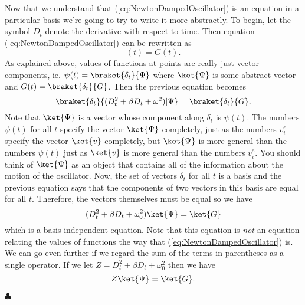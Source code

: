 Now that we understand that (\ref{eq:NewtonDampedOscillator}) is an equation in a particular basis we're going to try to write it more abstractly.  To begin, let the symbol $D_t$ denote the derivative with respect to time.  Then equation (\ref{eq:NewtonDampedOscillator}) can be rewritten as
\begin{displaymath} [(D_t^2 + \beta D_t + \omega ^2)\psi] (t) = G(t). \end{displaymath}
As explained above, values of functions at points are really just vector components, ie. $\psi(t) = \braket{\delta_t}{\Psi}$ where $\ket{\Psi}$ is some abstract vector and $G(t) = \braket{\delta_t}{G}$.  Then the previous equation becomes
\begin{displaymath} \braket{\delta_t}{(D_t^2 + \beta D_t + \omega ^2)| \Psi} = \braket{\delta_t}{G}. \end{displaymath}
Note that $\ket{\Psi}$ is a vector whose component along $\delta_t$ is $\psi(t)$.  The numbers $\psi(t)$ for all $t$ specify the vector $\ket{\Psi}$ completely, just as the numbers $v^e_i$ specify the vector $\ket{v}$ completely, but $\ket{\Psi}$ is more general than the numbers $\psi(t)$ just as $\ket{v}$ is more general than the numbers $v^e_i$.  You should think of $\ket{\Psi}$ as an object that contains all of the information about the motion of the oscillator.  Now, the set of vectors $\delta_t$ for all $t$ is a basis and the previous equation says that the components of two vectors in this basis are equal for all $t$.  Therefore, the vectors themselves must be equal so we have
\begin{displaymath} (D_t^2 + \beta D_t + \omega _0^2) \ket{\Psi} = \ket{G} \end{displaymath}
which is a basis independent equation.  Note that this equation is \emph{not} an equation relating the values of functions the way that (\ref{eq:NewtonDampedOscillator}) is.  We can go even further if we regard the sum of the terms in parentheses as a single operator.  If we let $Z = D_t^2 + \beta D_t + \omega_0^2$ then we have
\begin{equation}\label{eq:AbstractForDamped} Z \ket{\Psi} = \ket{G}. \end{equation}
\begin{flushright} $\clubsuit$ \end{flushright}
